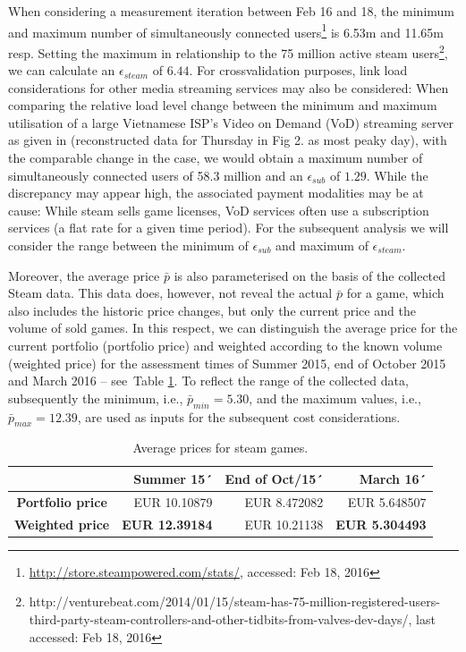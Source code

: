 

When considering a measurement iteration between Feb 16 and 18, the minimum and maximum number of simultaneously connected users\footnote{\url{http://store.steampowered.com/stats/}, accessed: Feb 18, 2016} is 6.53m and 11.65m	 resp. Setting the maximum in relationship to the 75 million active steam users\footnote{http://venturebeat.com/2014/01/15/steam-has-75-million-registered-users-third-party-steam-controllers-and-other-tidbits-from-valves-dev-days/, last accessed: Feb 18, 2016}, we can calculate an $\epsilon_{steam}$ of $6.44$. For crossvalidation purposes, link load considerations for other media streaming services may also be considered: When comparing the relative load level change between the minimum and maximum utilisation of a large Vietnamese ISP's Video on Demand (VoD) streaming server as given in \cite{thanh2012enabling} (reconstructed data for Thursday in Fig 2. as most peaky day), with the comparable change in the case, we would obtain a maximum number of simultaneously connected users of 58.3 million and an $\epsilon_{sub}$ of $1.29$. While the discrepancy may appear high, the associated payment modalities may be at cause: While steam sells game licenses, VoD services often use a subscription services (a flat rate for a given time period). For the subsequent analysis we will consider the range between the minimum of $\epsilon_{sub}$ and maximum of $\epsilon_{steam}$.

Moreover, the average price $\bar{p}$ is also parameterised on the basis of the collected Steam data. This data does, however, not reveal the actual $\bar{p}$ for a game, which also includes the historic price changes, but only the current price and the volume of sold games. In this respect, we can distinguish the average price for the current portfolio (portfolio price) and weighted according to the known volume (weighted price) for the assessment times of Summer 2015, end of October 2015 and March 2016 -- see~Table \ref{tab:dataset-stats}. To reflect the range of the collected data, subsequently the minimum, i.e.,  $\bar{p}_{min} = 5.30$, and the maximum values, i.e., $\bar{p}_{max} = 12.39$, are used as inputs for the subsequent cost considerations.

\begin{table}
\centering
\caption{Average prices for steam games.}
\label{tab:dataset-stats}
\begin{tabular}{c|r|r|r}
					& \textbf{Summer 15´} & \textbf{End of Oct/15´} & \textbf{March 16´} \\ \hline \hline
	\textbf{Portfolio price} & EUR 10.10879	& EUR 8.472082		& EUR 5.648507 \\
	\textbf{Weighted price} 	& \textbf{EUR 12.39184}	& EUR 10.21138		& \textbf{EUR 5.304493} \\
\end{tabular}
\end{table}

